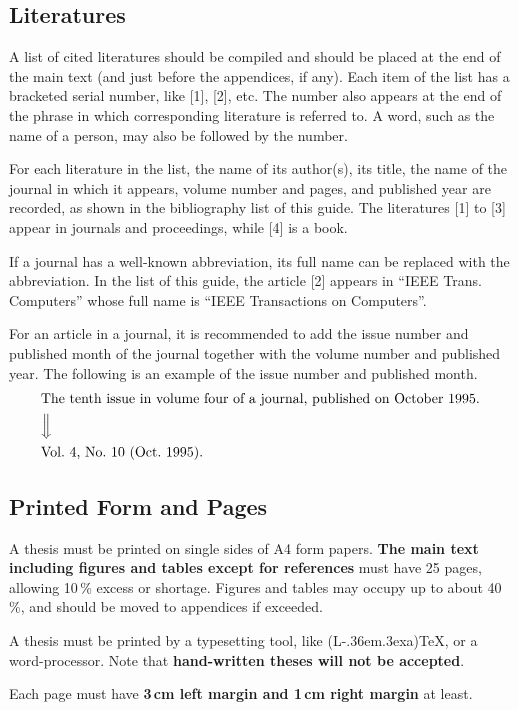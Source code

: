 \documentclass[english]{kuisthesis}
\def\LATEX{{\rm (L\kern-.36em\raise.3ex\hbox{\sc a})\TeX}}
\let\EM\bf
\begin{document}
\subsection{Literatures}\label{subsec-references}
A list of cited literatures should be compiled and should be placed at the 
end of the main text (and just before the appendices, if any).  Each item of
the list has a bracketed serial number, like [1], [2], etc. 
The number also appears at the end of the phrase in which
corresponding literature is referred to. A word, such as the name of a person,
may also be followed by the number.

For each literature in the list, the name of its author(s), its title, the
name of the journal in which it appears, volume number and pages, and
published year are recorded, as shown in the bibliography list of this guide.
The literatures [1] to [3] appear in journals and proceedings, while [4] is
a book.

If a journal has a well-known abbreviation, its full name can be replaced
with the abbreviation.  In the list of this guide, the article [2]
appears in ``IEEE Trans. Computers'' whose full name is ``IEEE Transactions
on Computers''.

For an article in a journal, it is recommended to add the issue number and
published month of the journal together with the volume number and published
year.  The following is an example of the issue number and published month.
\begin{eqnarray*}
&\hbox{The tenth issue in volume four of a journal, published on October 1995.}
\\
&\Big\Downarrow\\
&\hbox{Vol.~4, No.~10 (Oct.~1995)}.
\end{eqnarray*}

\subsection{Printed Form and Pages}\label{subsec-format}
A thesis must be printed on single sides of A4 form papers.  {\EM The main
text including figures and tables except for references} must have 25 pages, 
allowing 10\,\% excess or shortage.
Figures and tables may occupy up to about 40\,\%, and should be moved to
appendices if exceeded.

A thesis must be printed by a typesetting tool, like \LATEX, or a
word-processor.  Note that {\EM hand-written theses will not be accepted}.

Each page must have {\EM 3\,cm left margin and 1\,cm right margin} at least.
\end{document}
